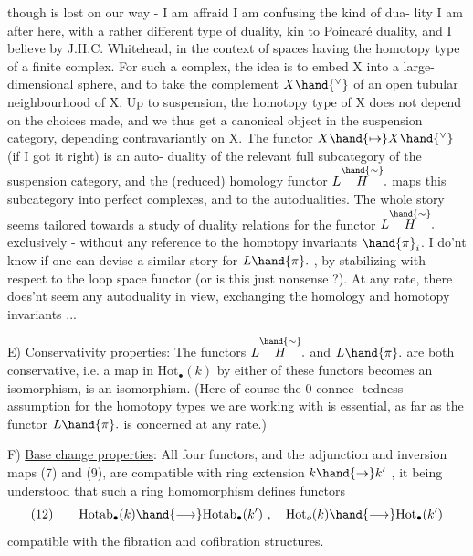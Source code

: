 
 though is lost on our way - I am affraid I am confusing the kind of dua-%
lity I am after here, with a rather different type of duality, kin to
Poincaré duality, and   I believe by J.H.C. Whitehead, in the context
of spaces having the homotopy type of a finite complex. For such a
complex, the idea  is to embed X into a large-dimensional sphere, and
to take the complement $X\hand{^{\vee}}$ of an open tubular neighbourhood of X. Up to
suspension, the homotopy type of X does not depend on the choices made,
and  we thus get a canonical object in the suspension category, depending
contravariantly on X. The functor $X\hand{\mapsto}X\hand{^{\vee}}$ (if I got it right) is an auto-%
duality of the relevant full subcategory of the suspension category,
and the (reduced) homology functor $L\overset{\hand{\sim}}{H}.$  maps this subcategory
into perfect complexes, and  to the autodualities. The whole
story seems tailored towards a study of duality relations for the functor
$L\overset{\hand{\sim}}{H}.$ exclusively - without any reference to the homotopy invariants $\hand{\pi}_{i}$.
I do'nt know if one can devise a similar story for $L\hand{\pi}.$ , by stabilizing
with respect to the loop space functor (or is this just nonsense ?). At
any rate, there does'nt seem any autoduality in view, exchanging the
homology and homotopy invariants ...

E) \uline{Conservativity properties:} The functors $L\overset{\hand{\sim}}{H}.$ and $L\hand{\pi}.$ are both
conservative, i.e. a map in $\mathrm{Hot}_{\bullet}(k)$   by either of these functors
becomes an isomorphism, is an isomorphism. (Here of course the 0-connec%
-tedness assumption for the  homotopy types we are working
with is essential, as far as the functor $L\hand{\pi}.$ is concerned at any rate.)

F) \uline{Base change properties}: All four functors, and the adjunction
and inversion maps (7) and (9), are compatible with ring extension
$k\hand{\to} k'$ , it being understood that such a ring homomorphism defines
functors
\[ (12)\qquad \mathrm{Hotab}_{\bullet}(k)\hand{\longrightarrow}\mathrm{Hotab}_{\bullet}(k') \ , \quad \mathrm{Hot}_{o}(k)\hand{\longrightarrow}\mathrm{Hot}_{\bullet}(k') \]
compatible with the fibration and cofibration structures.

